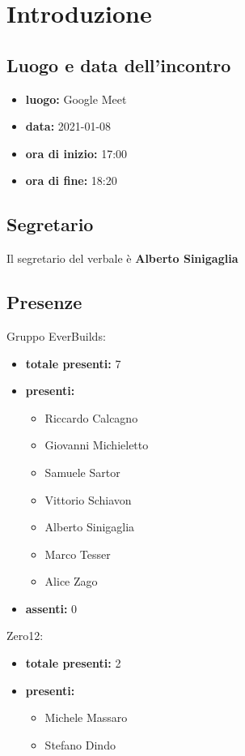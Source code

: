 \section{Introduzione}

\subsection{Luogo e data dell'incontro}
	\begin{itemize}
		\item \textbf{luogo:} Google Meet
		\item \textbf{data:} 2021-01-08
		\item \textbf{ora di inizio:} 17:00
		\item \textbf{ora di fine:} 18:20
	\end{itemize}

\subsection{Segretario}
Il segretario del verbale è \textbf{Alberto Sinigaglia}

\subsection{Presenze}
	Gruppo EverBuilds:
	\begin{itemize}
		\item \textbf{totale presenti:} 7
		\item \textbf{presenti: }
			\begin{itemize}		
				\item Riccardo Calcagno
				\item Giovanni Michieletto
				\item Samuele Sartor
				\item Vittorio Schiavon
				\item Alberto Sinigaglia
				\item Marco Tesser
				\item Alice Zago
			\end{itemize}
		\item \textbf{assenti: } 0
	\end{itemize}
	Zero12:
	\begin{itemize}
		\item \textbf{totale presenti:} 2
		\item \textbf{presenti: }
			\begin{itemize}		
				\item Michele Massaro
				\item Stefano Dindo
			\end{itemize}
	\end{itemize}


